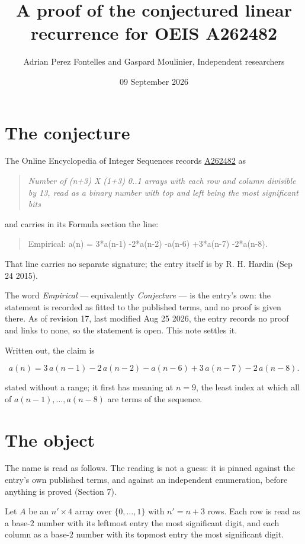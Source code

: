 \documentclass[11pt]{article}
\title{A proof of the conjectured linear recurrence for OEIS A262482}
\author{Adrian Perez Fontelles and Gaspard Moulinier, Independent researchers}
\date{09 September 2026}
\theoremstyle{definition}
\begin{document}
\maketitle
\section{The conjecture}

The Online Encyclopedia of Integer Sequences records \href{https://oeis.org/A262482}{A262482} as

\begin{quote}\itshape Number of (n+3) X (1+3) 0..1 arrays with each row and column divisible by 13, read as a binary number with top and left being the most significant bits\end{quote}

and carries in its Formula section the line:

\begin{quote}\ttfamily Empirical: a(n) = 3*a(n-1) -2*a(n-2) -a(n-6) +3*a(n-7) -2*a(n-8).\end{quote}

That line carries no separate signature; the entry itself is by R. H. Hardin (Sep 24 2015).

The word {\itshape Empirical} --- equivalently {\itshape Conjecture} --- is the entry's own: the statement is recorded as fitted to the published terms, and no proof is given there. As of revision 17, last modified Aug 25 2026, the entry records no proof and links to none, so the statement is open. This note settles it.

Written out, the claim is

\[a(n) = 3\,a(n-1) - 2\,a(n-2) - a(n-6) + 3\,a(n-7) - 2\,a(n-8).\]

stated without a range; it first has meaning at $n = 9$, the least index at which all of $a(n-1),\dots,a(n-8)$ are terms of the sequence.

\section{The object}

The name is read as follows. The reading is not a guess: it is pinned against the entry's own published terms, and against an independent enumeration, before anything is proved (Section 7).

Let $A$ be an $n' \times 4$ array over $\{0,\dots,1\}$ with $n' = n + 3$ rows. Each row is read as a base-$2$ number with its leftmost entry the most significant digit, and each column as a base-$2$ number with its topmost entry the most significant digit.
\end{document}
